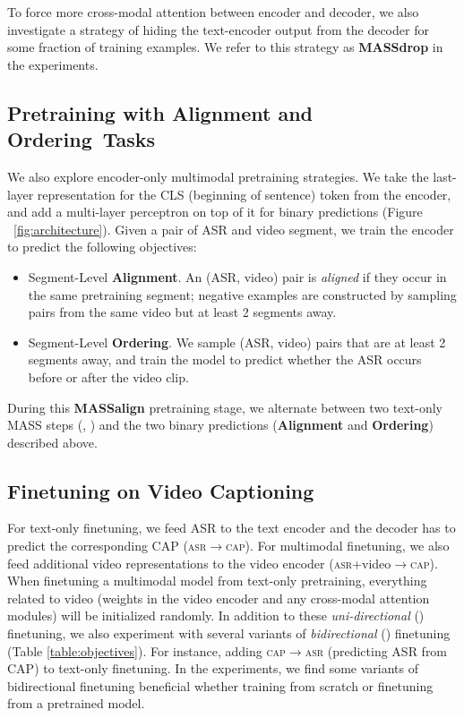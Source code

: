 \documentclass[11pt,a4paper]{article}
\begin{document}
To force more cross-modal attention between encoder and decoder,
we also investigate a strategy of hiding the text-encoder output from the decoder for some fraction of training examples.
We refer to this strategy as \textbf{MASSdrop} in the experiments.



\subsection{Pretraining with Alignment and Ordering~Tasks}

We also explore encoder-only multimodal pretraining strategies.
We take the last-layer representation for the CLS (beginning of sentence) token from the encoder, and add a multi-layer perceptron on top of it for binary predictions (Figure ~\ref{fig:architecture}).
Given a pair of ASR and video segment, we train the encoder to predict the following objectives:
\vspace{-0.5em}
\begin{itemize}
\setlength\itemsep{-0em}
  \item Segment-Level \textbf{Alignment}. An (ASR, video) pair is \textit{aligned} if they occur in the same pretraining segment; negative examples are constructed by sampling pairs from the same video but at least 2 segments away.
  \item Segment-Level \textbf{Ordering}.  We sample (ASR, video) pairs that are at least 2 segments away, and train the model to predict whether the ASR occurs before or after the video clip.
\end{itemize}





During this \textbf{MASSalign} pretraining stage, we alternate between two text-only MASS steps (\CAPtoCAP, \ASRtoASR) and the two binary predictions (\textbf{Alignment} and \textbf{Ordering}) described above.


\subsection{Finetuning on Video Captioning}



For text-only finetuning, we feed ASR to the text encoder and the decoder has to predict the corresponding CAP (\textsc{asr}$\to$\textsc{cap}). For multimodal finetuning, we also feed additional video representations to the video encoder (\textsc{asr}+video$\to$\textsc{cap}).  When finetuning a multimodal model from text-only pretraining, everything related to video (weights in the video encoder and any cross-modal attention modules) will be initialized randomly.
In addition to these \textit{uni-directional} (\textbf{\unimt}) finetuning, 
we also experiment with several variants of \textit{bidirectional}  (\textbf{\bimt}) finetuning (Table \ref{table:objectives}). For instance, adding \textsc{cap}$\to$\textsc{asr} (predicting ASR from CAP) to text-only finetuning.
In the experiments, we find some variants of bidirectional finetuning beneficial whether training from scratch or finetuning from a pretrained model.
\end{document}
